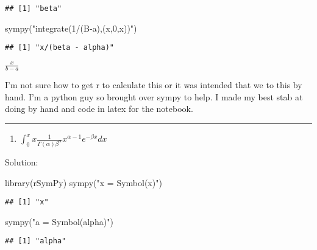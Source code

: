 \documentclass[
]{article}
\newenvironment{Shaded}{\begin{snugshade}}{\end{snugshade}}
\newcommand{\FunctionTok}[1]{\textcolor[rgb]{0.00,0.00,0.00}{#1}}
\newcommand{\NormalTok}[1]{#1}
\newcommand{\StringTok}[1]{\textcolor[rgb]{0.31,0.60,0.02}{#1}}
\providecommand{\tightlist}{%
  \setlength{\itemsep}{0pt}\setlength{\parskip}{0pt}}
\begin{document}
\begin{verbatim}
## [1] "beta"
\end{verbatim}

\begin{Shaded}
\begin{Highlighting}[]
\FunctionTok{sympy}\NormalTok{(}\StringTok{"integrate(1/(B{-}a),(x,0,x))"}\NormalTok{)}
\end{Highlighting}
\end{Shaded}

\begin{verbatim}
## [1] "x/(beta - alpha)"
\end{verbatim}

\(\frac{x}{b-a}\)

I'm not sure how to get r to calculate this or it was intended that we
to this by hand. I'm a python guy so brought over sympy to help. I made
my best stab at doing by hand and code in latex for the notebook.

\begin{center}\rule{0.5\linewidth}{0.5pt}\end{center}

\begin{enumerate}
\def\labelenumi{\arabic{enumi}.}
\setcounter{enumi}{7}
\tightlist
\item
  \(\int_0^x x \frac{1}{\Gamma(\alpha)\beta^\alpha} x^{\alpha -1} e^{-\beta x} dx\)
\end{enumerate}

Solution:

\begin{Shaded}
\begin{Highlighting}[]
\FunctionTok{library}\NormalTok{(rSymPy)}
\FunctionTok{sympy}\NormalTok{(}\StringTok{"x = Symbol(\textquotesingle{}x\textquotesingle{})"}\NormalTok{)}
\end{Highlighting}
\end{Shaded}

\begin{verbatim}
## [1] "x"
\end{verbatim}

\begin{Shaded}
\begin{Highlighting}[]
\FunctionTok{sympy}\NormalTok{(}\StringTok{"a = Symbol(\textquotesingle{}alpha\textquotesingle{})"}\NormalTok{)}
\end{Highlighting}
\end{Shaded}

\begin{verbatim}
## [1] "alpha"
\end{verbatim}
\end{document}
